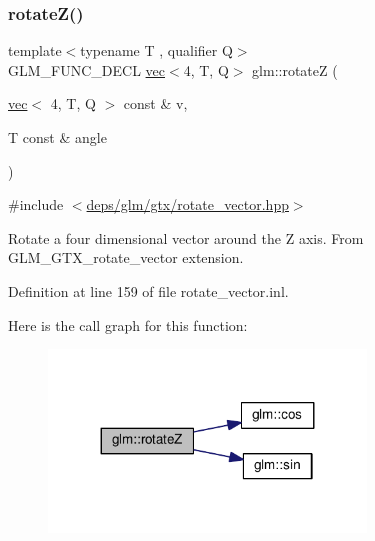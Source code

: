 \subsubsection{\texorpdfstring{rotate\+Z()}{rotateZ()}\hspace{0.1cm}{\footnotesize\ttfamily [2/2]}}
{\footnotesize\ttfamily template$<$typename T , qualifier Q$>$ \\
G\+L\+M\+\_\+\+F\+U\+N\+C\+\_\+\+D\+E\+CL \hyperlink{structglm_1_1vec}{vec}$<$4, T, Q$>$ glm\+::rotateZ (\begin{DoxyParamCaption}\item[{\hyperlink{structglm_1_1vec}{vec}$<$ 4, T, Q $>$ const \&}]{v,  }\item[{T const \&}]{angle }\end{DoxyParamCaption})}



{\ttfamily \#include $<$\hyperlink{rotate__vector_8hpp}{deps/glm/gtx/rotate\+\_\+vector.\+hpp}$>$}

Rotate a four dimensional vector around the Z axis. From G\+L\+M\+\_\+\+G\+T\+X\+\_\+rotate\+\_\+vector extension. 

Definition at line 159 of file rotate\+\_\+vector.\+inl.

Here is the call graph for this function\+:
\nopagebreak
\begin{figure}[H]
\begin{center}
\leavevmode
\includegraphics[width=239pt]{df/d02/group__gtx__rotate__vector_ga923b75c6448161053768822d880702e6_cgraph}
\end{center}
\end{figure}
\mbox{\label{group__gtx__rotate__vector_ga8b11b18ce824174ea1a5a69ea14e2cee}} 

